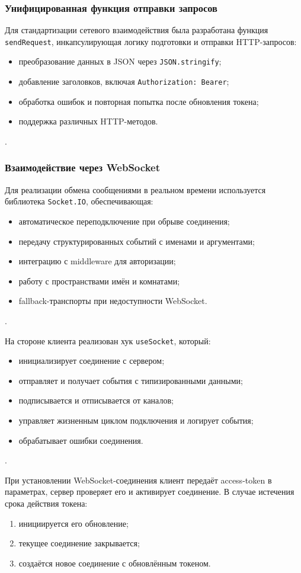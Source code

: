 \subsubsection{Унифицированная функция отправки запросов}
Для стандартизации сетевого взаимодействия была разработана функция \texttt{sendRequest}, инкапсулирующая логику подготовки и отправки HTTP-запросов:
\begin{itemize}
  \item преобразование данных в JSON через \texttt{JSON.stringify};
  \item добавление заголовков, включая \texttt{Authorization: Bearer};
  \item обработка ошибок и повторная попытка после обновления токена;
  \item поддержка различных HTTP-методов.
\end{itemize}.

\subsubsection{Взаимодействие через WebSocket}
Для реализации обмена сообщениями в реальном времени используется библиотека \texttt{Socket.IO}, обеспечивающая:
\begin{itemize}
  \item автоматическое переподключение при обрыве соединения;
  \item передачу структурированных событий с именами и аргументами;
  \item интеграцию с middleware для авторизации;
  \item работу с пространствами имён и комнатами;
  \item fallback-транспорты при недоступности WebSocket.
\end{itemize}.

На стороне клиента реализован хук \texttt{useSocket}, который:
\begin{itemize}
  \item инициализирует соединение с сервером;
  \item отправляет и получает события с типизированными данными;
  \item подписывается и отписывается от каналов;
  \item управляет жизненным циклом подключения и логирует события;
  \item обрабатывает ошибки соединения.
\end{itemize}.

При установлении WebSocket-соединения клиент передаёт access-token в параметрах, сервер проверяет его и активирует соединение. В случае истечения срока действия токена:
\begin{enumerate}
  \item инициируется его обновление;
  \item текущее соединение закрывается;
  \item создаётся новое соединение с обновлённым токеном.
\end{enumerate}

